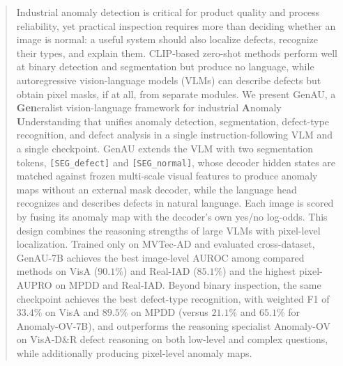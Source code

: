 \begin{abstract}
Industrial anomaly detection is critical for product quality and process reliability, yet practical inspection requires more than deciding whether an image is normal: a useful system should also localize defects, recognize their types, and explain them. CLIP-based zero-shot methods perform well at binary detection and segmentation but produce no language, while autoregressive vision-language models (VLMs) can describe defects but obtain pixel masks, if at all, from separate modules. We present GenAU, a \textbf{Gen}eralist vision-language framework for industrial \textbf{A}nomaly \textbf{U}nderstanding that unifies anomaly detection, segmentation, defect-type recognition, and defect analysis in a single instruction-following VLM and a single checkpoint. GenAU extends the VLM with two segmentation tokens, \texttt{[SEG\_defect]} and \texttt{[SEG\_normal]}, whose decoder hidden states are matched against frozen multi-scale visual features to produce anomaly maps without an external mask decoder, while the language head recognizes and describes defects in natural language. Each image is scored by fusing its anomaly map with the decoder's own yes/no log-odds. This design combines the reasoning strengths of large VLMs with pixel-level localization. Trained only on MVTec-AD and evaluated cross-dataset, GenAU-7B achieves the best image-level AUROC among compared methods on VisA ($90.1\%$) and Real-IAD ($85.1\%$) and the highest pixel-AUPRO on MPDD and Real-IAD. Beyond binary inspection, the same checkpoint achieves the best defect-type recognition, with weighted F1 of $33.4\%$ on VisA and $89.5\%$ on MPDD (versus $21.1\%$ and $65.1\%$ for Anomaly-OV-7B), and outperforms the reasoning specialist Anomaly-OV on VisA-D\&R defect reasoning on both low-level and complex questions, while additionally producing pixel-level anomaly maps.
\end{abstract}
